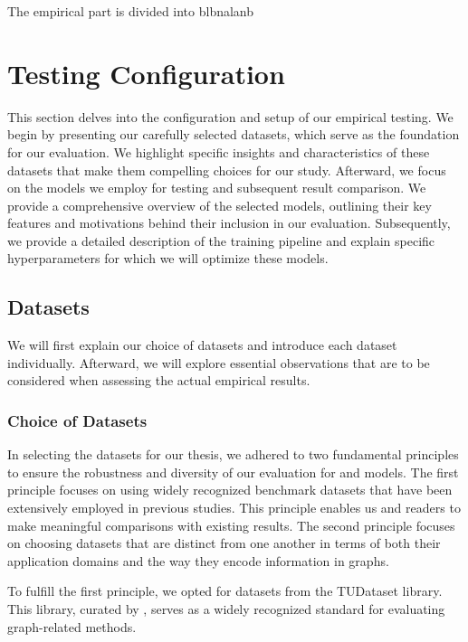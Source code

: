 The empirical part is divided into blbnalanb

\section{Testing Configuration}
This section delves into the configuration and setup of our empirical testing. We begin by presenting our carefully selected datasets, which serve as the foundation for our evaluation. We highlight specific insights and characteristics of these datasets that make them compelling choices for our study. Afterward, we focus on the models we employ for testing and subsequent result comparison. We provide a comprehensive overview of the selected models, outlining their key features and motivations behind their inclusion in our evaluation. Subsequently, we provide a detailed description of the training pipeline and explain specific hyperparameters for which we will optimize these models.

\subsection{Datasets}
We will first explain our choice of datasets and introduce each dataset individually. Afterward, we will explore essential observations that are to be considered when assessing the actual empirical results.

\subsubsection{Choice of Datasets}
In selecting the datasets for our thesis, we adhered to two fundamental principles to ensure the robustness and diversity of our evaluation for \gnn and \wlnn models. The first principle focuses on using widely recognized benchmark datasets that have been extensively employed in previous studies. This principle enables us and readers to make meaningful comparisons with existing results. The second principle focuses on choosing datasets that are distinct from one another in terms of both their application domains and the way they encode information in graphs.

To fulfill the first principle, we opted for datasets from the TUDataset library. This library, curated by \cite{Mor+2020}, serves as a widely recognized standard for evaluating graph-related methods.

